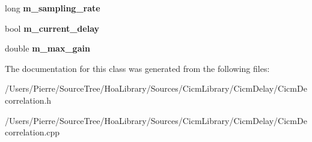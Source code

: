 \begin{DoxyCompactItemize}
\item 
\hypertarget{class_cicm_decorrelation_ac0f74442ab5589fadb12506901891ab8}{long {\bfseries m\-\_\-sampling\-\_\-rate}}\label{class_cicm_decorrelation_ac0f74442ab5589fadb12506901891ab8}

\item 
\hypertarget{class_cicm_decorrelation_ab29359b5e03582b47148613d794564c8}{bool {\bfseries m\-\_\-current\-\_\-delay}}\label{class_cicm_decorrelation_ab29359b5e03582b47148613d794564c8}

\item 
\hypertarget{class_cicm_decorrelation_a56b9a6b601cd341c0193e57d604d2aaa}{double {\bfseries m\-\_\-max\-\_\-gain}}\label{class_cicm_decorrelation_a56b9a6b601cd341c0193e57d604d2aaa}

\end{DoxyCompactItemize}


The documentation for this class was generated from the following files\-:\begin{DoxyCompactItemize}
\item 
/\-Users/\-Pierre/\-Source\-Tree/\-Hoa\-Library/\-Sources/\-Cicm\-Library/\-Cicm\-Delay/Cicm\-Decorrelation.\-h\item 
/\-Users/\-Pierre/\-Source\-Tree/\-Hoa\-Library/\-Sources/\-Cicm\-Library/\-Cicm\-Delay/Cicm\-Decorrelation.\-cpp\end{DoxyCompactItemize}
